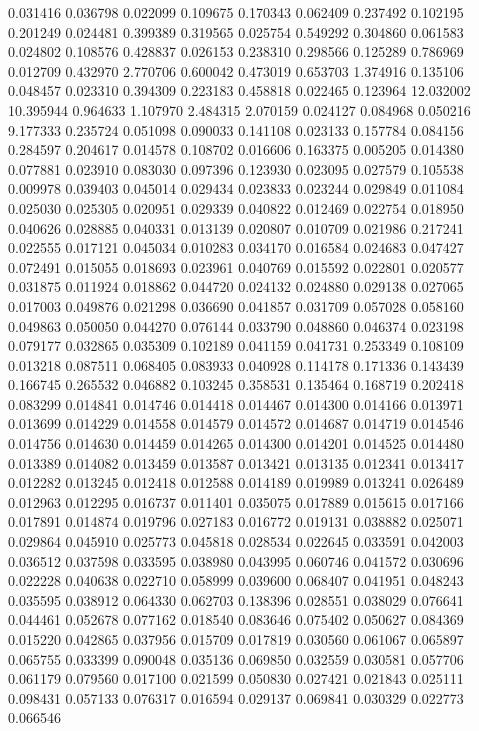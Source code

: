 0.031416
0.036798
0.022099
0.109675
0.170343
0.062409
0.237492
0.102195
0.201249
0.024481
0.399389
0.319565
0.025754
0.549292
0.304860
0.061583
0.024802
0.108576
0.428837
0.026153
0.238310
0.298566
0.125289
0.786969
0.012709
0.432970
2.770706
0.600042
0.473019
0.653703
1.374916
0.135106
0.048457
0.023310
0.394309
0.223183
0.458818
0.022465
0.123964
12.032002
10.395944
0.964633
1.107970
2.484315
2.070159
0.024127
0.084968
0.050216
9.177333
0.235724
0.051098
0.090033
0.141108
0.023133
0.157784
0.084156
0.284597
0.204617
0.014578
0.108702
0.016606
0.163375
0.005205
0.014380
0.077881
0.023910
0.083030
0.097396
0.123930
0.023095
0.027579
0.105538
0.009978
0.039403
0.045014
0.029434
0.023833
0.023244
0.029849
0.011084
0.025030
0.025305
0.020951
0.029339
0.040822
0.012469
0.022754
0.018950
0.040626
0.028885
0.040331
0.013139
0.020807
0.010709
0.021986
0.217241
0.022555
0.017121
0.045034
0.010283
0.034170
0.016584
0.024683
0.047427
0.072491
0.015055
0.018693
0.023961
0.040769
0.015592
0.022801
0.020577
0.031875
0.011924
0.018862
0.044720
0.024132
0.024880
0.029138
0.027065
0.017003
0.049876
0.021298
0.036690
0.041857
0.031709
0.057028
0.058160
0.049863
0.050050
0.044270
0.076144
0.033790
0.048860
0.046374
0.023198
0.079177
0.032865
0.035309
0.102189
0.041159
0.041731
0.253349
0.108109
0.013218
0.087511
0.068405
0.083933
0.040928
0.114178
0.171336
0.143439
0.166745
0.265532
0.046882
0.103245
0.358531
0.135464
0.168719
0.202418
0.083299
0.014841
0.014746
0.014418
0.014467
0.014300
0.014166
0.013971
0.013699
0.014229
0.014558
0.014579
0.014572
0.014687
0.014719
0.014546
0.014756
0.014630
0.014459
0.014265
0.014300
0.014201
0.014525
0.014480
0.013389
0.014082
0.013459
0.013587
0.013421
0.013135
0.012341
0.013417
0.012282
0.013245
0.012418
0.012588
0.014189
0.019989
0.013241
0.026489
0.012963
0.012295
0.016737
0.011401
0.035075
0.017889
0.015615
0.017166
0.017891
0.014874
0.019796
0.027183
0.016772
0.019131
0.038882
0.025071
0.029864
0.045910
0.025773
0.045818
0.028534
0.022645
0.033591
0.042003
0.036512
0.037598
0.033595
0.038980
0.043995
0.060746
0.041572
0.030696
0.022228
0.040638
0.022710
0.058999
0.039600
0.068407
0.041951
0.048243
0.035595
0.038912
0.064330
0.062703
0.138396
0.028551
0.038029
0.076641
0.044461
0.052678
0.077162
0.018540
0.083646
0.075402
0.050627
0.084369
0.015220
0.042865
0.037956
0.015709
0.017819
0.030560
0.061067
0.065897
0.065755
0.033399
0.090048
0.035136
0.069850
0.032559
0.030581
0.057706
0.061179
0.079560
0.017100
0.021599
0.050830
0.027421
0.021843
0.025111
0.098431
0.057133
0.076317
0.016594
0.029137
0.069841
0.030329
0.022773
0.066546

